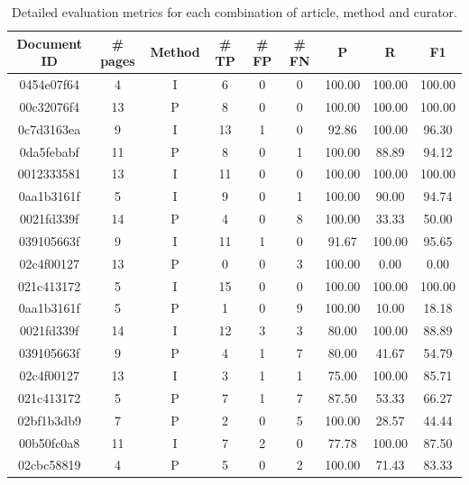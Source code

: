 \begin{table}[h]
\centering
\small
\caption{Detailed evaluation metrics for each combination of article, method and curator. }
\begin{tabular}{cc|c|ccc|ccc}

Document ID & \# pages & Method & \# TP	& \# FP	& \# FN	& P	& R	& F1 \\
\hline
0454e07f64  & 4     & I     & 6     & 0     &   0   & 100.00    & 100.00    & 100.00 \\
00c32076f4  & 13    & P     & 8     & 0     &   0   & 100.00    & 100.00    & 100.00 \\
0c7d3163ea  & 9     & I     & 13    & 1     &   0   & 92.86     & 100.00    & 96.30 \\
0da5febabf  & 11    & P     & 8     & 0     &   1   & 100.00    & 88.89     & 94.12 \\
0012333581  & 13    & I     & 11    & 0     &   0   & 100.00    & 100.00    & 100.00 \\
0aa1b3161f  & 5     & I     & 9     & 0     &   1   & 100.00    & 90.00     & 94.74 \\
0021fd339f  & 14    & P     & 4     & 0     &   8   & 100.00    & 33.33     & 50.00 \\
039105663f  & 9     & I     & 11    & 1     &   0   & 91.67     & 100.00    & 95.65 \\
02c4f00127  & 13    & P     & 0     & 0     &   3   & 100.00    & 0.00      & 0.00 \\
021c413172  & 5     & I     & 15    & 0     &   0   & 100.00    & 100.00    & 100.00 \\
0aa1b3161f  & 5     & P     & 1     & 0     &   9   & 100.00    & 10.00     & 18.18 \\
0021fd339f  & 14    & I     & 12    & 3     &   3   & 80.00     & 100.00    & 88.89 \\
039105663f  & 9     & P     & 4     & 1     &   7   & 80.00     & 41.67     & 54.79 \\
02c4f00127  & 13    & I     & 3     & 1     &   1   & 75.00     & 100.00    & 85.71 \\
021c413172  & 5     & P     & 7     & 1     &   7   & 87.50     & 53.33     & 66.27 \\
02bf1b3db9  & 7     & P     & 2     & 0     &   5   & 100.00    & 28.57     & 44.44 \\
00b50fc0a8  & 11    & I     & 7     & 2     &   0   & 77.78     & 100.00    & 87.50 \\
02cbc58819  & 4     & P     & 5     & 0     &   2   & 100.00    & 71.43     & 83.33 \\

\end{tabular}
\end{table}
